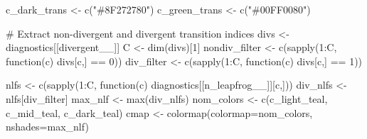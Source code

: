 \documentclass[
  letterpaper,
  DIV=11,
  numbers=noendperiod]{scrartcl}
\newenvironment{Shaded}{\begin{snugshade}}{\end{snugshade}}
\newcommand{\AttributeTok}[1]{\textcolor[rgb]{0.40,0.45,0.13}{#1}}
\newcommand{\CommentTok}[1]{\textcolor[rgb]{0.37,0.37,0.37}{#1}}
\newcommand{\ControlFlowTok}[1]{\textcolor[rgb]{0.00,0.23,0.31}{#1}}
\newcommand{\DecValTok}[1]{\textcolor[rgb]{0.68,0.00,0.00}{#1}}
\newcommand{\FunctionTok}[1]{\textcolor[rgb]{0.28,0.35,0.67}{#1}}
\newcommand{\NormalTok}[1]{\textcolor[rgb]{0.00,0.23,0.31}{#1}}
\newcommand{\OtherTok}[1]{\textcolor[rgb]{0.00,0.23,0.31}{#1}}
\newcommand{\SpecialCharTok}[1]{\textcolor[rgb]{0.37,0.37,0.37}{#1}}
\newcommand{\StringTok}[1]{\textcolor[rgb]{0.13,0.47,0.30}{#1}}
\begin{document}
\begin{Shaded}
\begin{Highlighting}[]
\NormalTok{  c\_dark\_trans }\OtherTok{\textless{}{-}} \FunctionTok{c}\NormalTok{(}\StringTok{"\#8F272780"}\NormalTok{)}
\NormalTok{  c\_green\_trans }\OtherTok{\textless{}{-}} \FunctionTok{c}\NormalTok{(}\StringTok{"\#00FF0080"}\NormalTok{)}
  
  \CommentTok{\# Extract non{-}divergent and divergent transition indices}
\NormalTok{  divs }\OtherTok{\textless{}{-}}\NormalTok{ diagnostics[[}\StringTok{\textquotesingle{}divergent\_\_\textquotesingle{}}\NormalTok{]]}
\NormalTok{  C }\OtherTok{\textless{}{-}} \FunctionTok{dim}\NormalTok{(divs)[}\DecValTok{1}\NormalTok{]}
\NormalTok{  nondiv\_filter }\OtherTok{\textless{}{-}} \FunctionTok{c}\NormalTok{(}\FunctionTok{sapply}\NormalTok{(}\DecValTok{1}\SpecialCharTok{:}\NormalTok{C, }\ControlFlowTok{function}\NormalTok{(c) divs[c,] }\SpecialCharTok{==} \DecValTok{0}\NormalTok{))}
\NormalTok{  div\_filter    }\OtherTok{\textless{}{-}} \FunctionTok{c}\NormalTok{(}\FunctionTok{sapply}\NormalTok{(}\DecValTok{1}\SpecialCharTok{:}\NormalTok{C, }\ControlFlowTok{function}\NormalTok{(c) divs[c,] }\SpecialCharTok{==} \DecValTok{1}\NormalTok{))}
  
\NormalTok{  nlfs }\OtherTok{\textless{}{-}} \FunctionTok{c}\NormalTok{(}\FunctionTok{sapply}\NormalTok{(}\DecValTok{1}\SpecialCharTok{:}\NormalTok{C, }
                   \ControlFlowTok{function}\NormalTok{(c) diagnostics[[}\StringTok{\textquotesingle{}n\_leapfrog\_\_\textquotesingle{}}\NormalTok{]][c,]))}
\NormalTok{  div\_nlfs }\OtherTok{\textless{}{-}}\NormalTok{ nlfs[div\_filter]}
\NormalTok{  max\_nlf }\OtherTok{\textless{}{-}} \FunctionTok{max}\NormalTok{(div\_nlfs)}
\NormalTok{  nom\_colors }\OtherTok{\textless{}{-}} \FunctionTok{c}\NormalTok{(c\_light\_teal, c\_mid\_teal, c\_dark\_teal)}
\NormalTok{  cmap }\OtherTok{\textless{}{-}} \FunctionTok{colormap}\NormalTok{(}\AttributeTok{colormap=}\NormalTok{nom\_colors, }\AttributeTok{nshades=}\NormalTok{max\_nlf)}
  

\end{Highlighting}
\end{Shaded}
\end{document}
